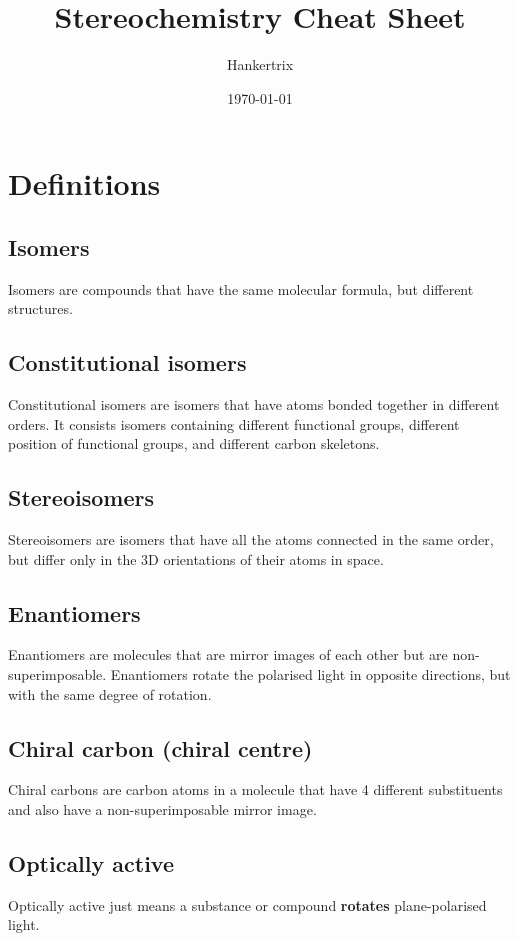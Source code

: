 \documentclass[11pt]{article}
\author{Hankertrix}
\date{\today}
\title{Stereochemistry Cheat Sheet}
\begin{document}
\maketitle
\setcounter{tocdepth}{2}
\tableofcontents

\newpage

\section{Definitions}
\label{sec:org5d3fc38}

\subsection{Isomers}
\label{sec:orge5597c5}
Isomers are compounds that have the same molecular formula, but different structures.

\subsection{Constitutional isomers}
\label{sec:org00172c0}
Constitutional isomers are isomers that have atoms bonded together in different orders. It consists isomers containing different functional groups, different position of functional groups, and different carbon skeletons.

\subsection{Stereoisomers}
\label{sec:org82f5794}
Stereoisomers are isomers that have all the atoms connected in the same order, but differ only in the 3D orientations of their atoms in space.

\subsection{Enantiomers}
\label{sec:org3297bea}
Enantiomers are molecules that are mirror images of each other but are non-superimposable. Enantiomers rotate the polarised light in opposite directions, but with the same degree of rotation.

\subsection{Chiral carbon (chiral centre)}
\label{sec:org6e5ecf6}
Chiral carbons are carbon atoms in a molecule that have 4 different substituents and also have a non-superimposable mirror image.

\subsection{Optically active}
\label{sec:orgdfd0958}
Optically active just means a substance or compound \textbf{rotates} plane-polarised light.
\end{document}
